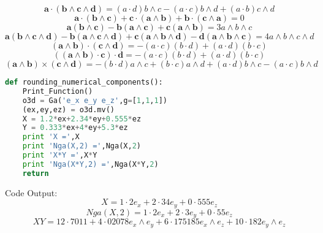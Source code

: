 \documentclass[10pt,fleqn]{report}
\newcommand{\W}{\wedge}
\begin{document}
\begin{equation*} \bm{a\cdot (b\W c\W d)} = \left ( a\cdot d\right )  b\wedge c - \left ( a\cdot c\right )  b\wedge d + \left ( a\cdot b\right )  c\wedge d \end{equation*}
\begin{equation*} \bm{a\cdot (b\W c)+c\cdot (a\W b)+b\cdot (c\W a)} = 0 \end{equation*}
\begin{equation*} \bm{a (b\W c)-b (a\W c)+c (a\W b)} = 3 a\wedge b\wedge c \end{equation*}
\begin{equation*} \bm{a (b\W c\W d)-b (a\W c\W d)+c (a\W b\W d)-d (a\W b\W c)} = 4 a\wedge b\wedge c\wedge d \end{equation*}
\begin{equation*} \bm{(a\W b)\cdot (c\W d)} = - \left ( a\cdot c\right )  \left ( b\cdot d\right )  + \left ( a\cdot d\right )  \left ( b\cdot c\right ) \end{equation*}
\begin{equation*} \bm{((a\W b)\cdot c)\cdot d} = - \left ( a\cdot c\right )  \left ( b\cdot d\right )  + \left ( a\cdot d\right )  \left ( b\cdot c\right ) \end{equation*}
\begin{equation*} \bm{(a\W b)\times (c\W d)} = - \left ( b\cdot d\right )  a\wedge c + \left ( b\cdot c\right )  a\wedge d + \left ( a\cdot d\right )  b\wedge c - \left ( a\cdot c\right )  b\wedge d \end{equation*}
\begin{lstlisting}[language=Python,showspaces=false,showstringspaces=false,backgroundcolor=\color{gray},frame=single]
def rounding_numerical_components():
    Print_Function()
    o3d = Ga('e_x e_y e_z',g=[1,1,1])
    (ex,ey,ez) = o3d.mv()
    X = 1.2*ex+2.34*ey+0.555*ez
    Y = 0.333*ex+4*ey+5.3*ez
    print 'X =',X
    print 'Nga(X,2) =',Nga(X,2)
    print 'X*Y =',X*Y
    print 'Nga(X*Y,2) =',Nga(X*Y,2)
    return
\end{lstlisting}
Code Output:
\begin{equation*} X = 1 \cdot 2 e_{x} + 2 \cdot 34 e_{y} + 0 \cdot 555 e_{z} \end{equation*}
\begin{equation*} Nga(X,2) = 1 \cdot 2 e_{x} + 2 \cdot 3 e_{y} + 0 \cdot 55 e_{z} \end{equation*}
\begin{equation*} X Y = 12 \cdot 7011  + 4 \cdot 02078 e_{x}\wedge e_{y} + 6 \cdot 175185 e_{x}\wedge e_{z} + 10 \cdot 182 e_{y}\wedge e_{z} \end{equation*}
\end{document}
